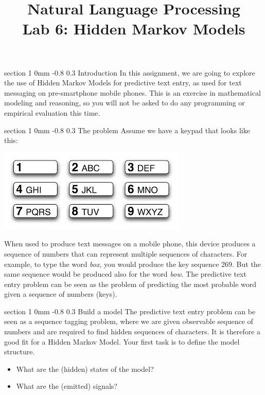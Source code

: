 \documentclass[11pt]{article}
\title{{\LARGE Natural Language Processing}\\[1.5mm]{\large Lab 6: Hidden Markov Models}}
\author{}
\date{} %
\makeatletter
\newcommand{\newsec}[2]{\section{#1}\label{sec:#2}\noindent}
\renewcommand{\section}{\@startsection
{section}%
{1}%
{0mm}%
{-0.8\baselineskip}%
{0.3\baselineskip}%
{\bfseries\large}}%
\makeatother
\begin{document}
 

\maketitle
\vspace{-2mm} \newsec{Introduction}{intro}%
In this assignment, we are going to explore the use of Hidden Markov
Models for predictive text entry, as used for text messaging on
pre-smartphone mobile phones.  This is an exercise in mathematical
modeling and reasoning, so you will not be asked to do any programming
or empirical evaluation this time.

\newsec{The problem}{problem}%
Assume we have a keypad that looks like this:
\begin{center}
\includegraphics[scale=0.5]{keypad.jpeg}
\end{center}
When used to produce text messages on a mobile phone, this device
produces a sequence of numbers that can represent multiple sequences
of characters.  For example, to type the word {\em box}, you would
produce the key sequence 269. But the same sequence would be produced
also for the word {\em bow}.  The predictive text entry problem can be
seen as the problem of predicting the most probable word given a
sequence of numbers (keys).

\newsec{Build a model}{model}%
The predictive text entry problem can be seen as a sequence tagging
problem, where we are given observable sequence of numbers and are
required to find hidden sequences of characters. It is therefore a
good fit for a Hidden Markov Model. Your first task is to define the
model structure.
\begin{itemize}[noitemsep,topsep=0.2cm]
\item What are the (hidden) states of the model?
\item What are the (emitted) signals?
\end{itemize}
\end{document}
